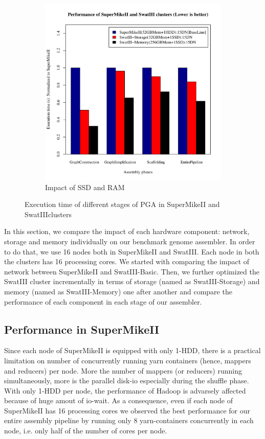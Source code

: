 \documentclass[conference]{IEEEtran}
\begin{document}
\begin{figure}[h]
\begin{subfigure}[b]{0.23\textwidth}
                \includegraphics[width=\textwidth]{Figure/PerormanceData/Plots/SuperMikeSwatSameNode.pdf}
                \caption{Impact of SSD and RAM}
                \label{fig:SuperMikeSwatStorageMemory}
   \end{subfigure}
   \caption{Execution time of different stages of PGA in SuperMikeII and SwatIIIclusters}
  \label{fig:SuperMikeSwat}
\end{figure}
In this section, we compare the impact of each hardware component: network, storage and memory individually on our benchmark genome assembler.
In order to do that, we use 16 nodes both in SuperMikeII and SwatIII. Each node in both the clusters has 16 processing cores.
We started with comparing the impact of network between SuperMikeII and SwatIII-Basic.
Then, we further optimized the SwatIII cluster incrementally in terms of storage (named as SwatIII-Storage) and memory (named as SwatIII-Memory) one after another and compare the performance of each component in each stage of our assembler.

\subsection {Performance in SuperMikeII}
\label{PerformanceInSuperMikeII}
Since each node of SuperMikeII is equipped with only 1-HDD, there is a practical limitation on number of concurrently running yarn containers (hence, mappers and reducers) per node. 
More the number of mappers (or reducers) running simultaneously, more is the parallel disk-io especially during the shuffle phase. 
With only 1-HDD per node, the performance of Hadoop is advarsely affected because of huge amout of io-wait.
As a consequence, even if each node of SuperMikeII has 16 processing cores we observed the best performance for our entire assembly pipeline by running only 8 yarn-containers concurrently in each node, i.e. only half of the number of cores per node.
\end{document}
